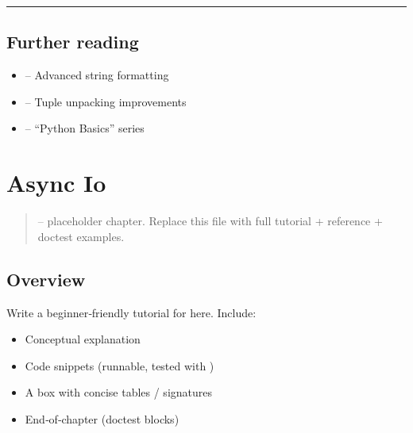 \documentclass[a4paper,11pt,english]{sphinxmanual}
\begin{document}
\bigskip\hrule\bigskip



\subsection{Further reading}
\label{\detokenize{core_language/syntax_basic_types:further-reading}}\begin{itemize}
\item {} 
\sphinxAtStartPar
{} – Advanced string formatting

\item {} 
\sphinxAtStartPar
{} – Tuple unpacking improvements

\item {} 
\sphinxAtStartPar
{} – “Python Basics” series

\end{itemize}

\sphinxstepscope


\section{Async Io}
\label{\detokenize{stdlib/async_io:async-io}}\label{\detokenize{stdlib/async_io::doc}}\begin{quote}

\sphinxAtStartPar
{} – placeholder chapter. Replace this file with full tutorial + reference + doctest examples.
\end{quote}


\subsection{Overview}
\label{\detokenize{stdlib/async_io:overview}}
\sphinxAtStartPar
Write a beginner‑friendly tutorial for  here. Include:
\begin{itemize}
\item {} 
\sphinxAtStartPar
Conceptual explanation

\item {} 
\sphinxAtStartPar
Code snippets (runnable, tested with )

\item {} 
\sphinxAtStartPar
A  box with concise tables / signatures

\item {} 
\sphinxAtStartPar
End‑of‑chapter  (doctest blocks)

\end{itemize}
\end{document}
